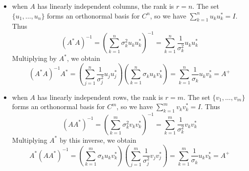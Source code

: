\documentclass[a4paper]{article}
\begin{document}
\begin{itemize}
  \item when $A$ has linearly independent columns, the rank is $r=n$. The set $\{u_1, \dots, u_n\}$ forms an orthonormal basis for ${C}^n$, so we have $\sum_{k=1}^n u_k u_k^* = I$. Thus
  \begin{equation}
    (A^*A)^{-1} = \left(\sum_{k=1}^n \sigma_k^2 u_k u_k^*\right)^{-1} = \sum_{k=1}^n \frac{1}{\sigma_k^2} u_k u_k^*
  \end{equation}
  Multiplying by $A^*$, we obtain
  \begin{equation}
    (A^*A)^{-1}A^* = \left(\sum_{j=1}^n \frac{1}{\sigma_j^2} u_j u_j^*\right) \left(\sum_{k=1}^n \sigma_k u_k v_k^*\right) = \sum_{k=1}^n \frac{1}{\sigma_k} u_k v_k^* = A^+
  \end{equation}

  \item when $A$ has linearly independent rows, the rank is $r=m$. The set $\{v_1, \dots, v_m\}$ forms an orthonormal basis for ${C}^m$, so we have $\sum_{k=1}^m v_k v_k^* = I$. Thus
  \begin{equation}
    (AA^*)^{-1} = \left(\sum_{k=1}^m \sigma_k^2 v_k v_k^*\right)^{-1} = \sum_{k=1}^m \frac{1}{\sigma_k^2} v_k v_k^*
  \end{equation}
  Multiplying $A^*$ by this inverse, we obtain
  \begin{equation}
    A^*(AA^*)^{-1} = \left(\sum_{k=1}^m \sigma_k u_k v_k^*\right) \left(\sum_{j=1}^m \frac{1}{\sigma_j^2} v_j v_j^*\right) = \sum_{k=1}^m \frac{1}{\sigma_k} u_k v_k^* = A^+
  \end{equation}

\end{itemize}
\end{document}
